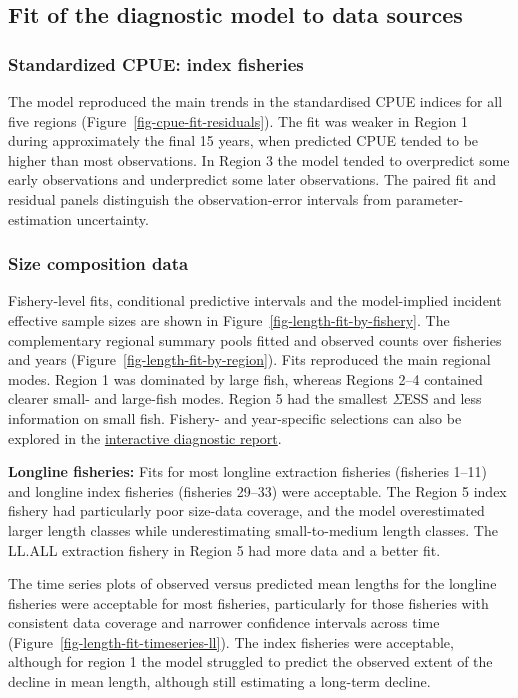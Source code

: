 \documentclass[
  english,
  a4paper,
  a4paper,
  11pt]{SCreport}
\begin{document}
\subsection{Fit of the diagnostic model to data
sources}\label{sec-fit-diag}

\subsubsection{Standardized CPUE: index fisheries}\label{sec-fit-cpue}

The model reproduced the main trends in the standardised CPUE indices
for all five regions (Figure~\ref{fig-cpue-fit-residuals}). The fit was
weaker in Region 1 during approximately the final 15 years, when
predicted CPUE tended to be higher than most observations. In Region 3
the model tended to overpredict some early observations and underpredict
some later observations. The paired fit and residual panels distinguish
the observation-error intervals from parameter-estimation uncertainty.

\subsubsection{Size composition data}\label{fit_sizecomp}

Fishery-level fits, conditional predictive intervals and the
model-implied incident effective sample sizes are shown in
Figure~\ref{fig-length-fit-by-fishery}. The complementary regional
summary pools fitted and observed counts over fisheries and years
(Figure~\ref{fig-length-fit-by-region}). Fits reproduced the main
regional modes. Region 1 was dominated by large fish, whereas Regions
2--4 contained clearer small- and large-fish modes. Region 5 had the
smallest \(\Sigma\)ESS and less information on small fish. Fishery- and
year-specific selections can also be explored in the
\href{https://pacificcommunity.github.io/ofp-sam-bet-2026-diagnostic/bet-2026-diagnostic-report.html}{interactive
diagnostic report}.

\textbf{Longline fisheries:} Fits for most longline extraction fisheries
(fisheries 1--11) and longline index fisheries (fisheries 29--33) were
acceptable. The Region 5 index fishery had particularly poor size-data
coverage, and the model overestimated larger length classes while
underestimating small-to-medium length classes. The LL.ALL extraction
fishery in Region 5 had more data and a better fit.

The time series plots of observed versus predicted mean lengths for the
longline fisheries were acceptable for most fisheries, particularly for
those fisheries with consistent data coverage and narrower confidence
intervals across time (Figure~\ref{fig-length-fit-timeseries-ll}). The
index fisheries were acceptable, although for region 1 the model
struggled to predict the observed extent of the decline in mean length,
although still estimating a long-term decline.
\end{document}
